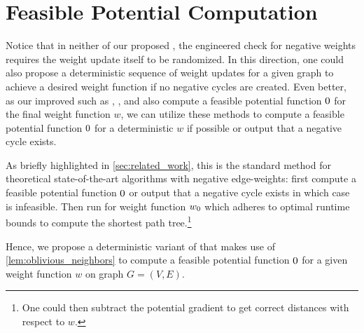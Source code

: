 \chapter{Feasible Potential Computation}\label{sec:pot_gen}
Notice that in neither of our proposed \markovs, the engineered check for negative weights requires the weight update itself to be randomized.
In this direction, one could also propose a deterministic sequence of weight updates for a given graph to achieve a desired weight function if no negative cycles are created.
Even better, as our improved \markovs such as \algsp, \algbp, and \algns also compute a feasible potential function $\pot$ for the final weight function $w$, we can utilize these methods to compute a feasible potential function $\pot$ for a deterministic $w$ if possible or output that a negative cycle exists.

As briefly highlighted in \cref{sec:related_work}, this is the standard method for theoretical state-of-the-art \sssp algorithms with negative edge-weights: first compute a feasible potential function $\pot$ or output that a negative cycle exists in which case \sssp is infeasible.
Then run \algdk for weight function $\wpot$ which adheres to optimal runtime bounds to compute the shortest path tree.\footnote{
  One could then subtract the potential gradient to get correct distances with respect to $w$.
}

Hence, we propose a deterministic variant of \algns that makes use of \cref{lem:oblivious_neighbors} to compute a feasible potential function $\pot$ for a given weight function $w$ on graph $G = (V,E)$.

